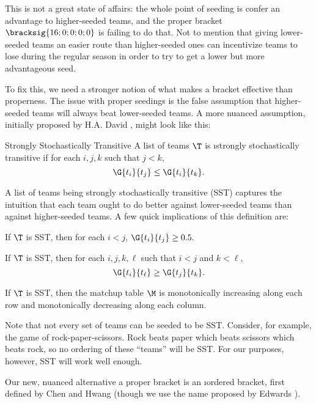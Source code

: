 {This is not a great state of affairs: the whole point of seeding is confer an advantage to higher-seeded teams, and the proper bracket $\bracksig{16; 0; 0; 0; 0}$ is failing to do that. Not to mention that giving lower-seeded teams an easier route than higher-seeded ones can incentivize teams to lose during the regular season in order to try to get a lower but more advantageous seed.

To fix this, we need a stronger notion of what makes a bracket effective than properness. The issue with proper seedings is the false assumption that higher-seeded teams will always beat lower-seeded teams. A more nuanced assumption, initially proposed by H.A. David \cite{stochastic}, might look like this:

\begin{definition}{Strongly Stochastically Transitive}{}
    A list of teams $\T$ is \i{strongly stochastically transitive} if for each $i, j, k$ such that $j < k$, $$\G{t_i}{t_j} \leq \G{t_i}{t_k}.$$
\end{definition}

A list of teams being strongly stochastically transitive (SST) captures the intuition that each team ought to do better against lower-seeded teams than against higher-seeded teams. A few quick implications of this definition are:

\begin{corollary}{}{}
    If $\T$ is SST, then for each $i < j$, $\G{t_i}{t_j} \geq 0.5.$
\end{corollary}

\begin{corollary}{}{}
    If $\T$ is SST, then for each $i, j, k, \ell$ such that $i < j$ and $k < \ell$, $$\G{t_i}{t_\ell} \geq \G{t_j}{t_k}.$$
\end{corollary}

\begin{corollary}{}{}
    If $\T$ is SST, then the matchup table $\M$ is monotonically increasing along each row and monotonically decreasing along each column.
\end{corollary}


Note that not every set of teams can be seeded to be SST. Consider, for example, the game of rock-paper-scissors. Rock beats paper which beats scissors which beats rock, so no ordering of these ``teams'' will be SST. For our purposes, however, SST will work well enough.

Our new, nuanced alternative a proper bracket is an \i{ordered bracket}, first defined by Chen and Hwang \cite{define_ordered}  (though we use the name proposed by Edwards \cite{montana}).

}
